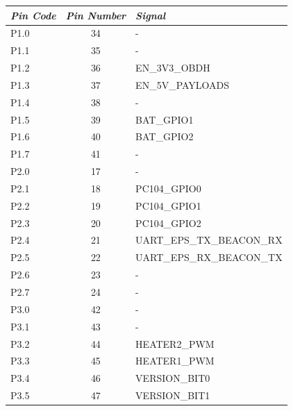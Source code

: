 \begin{longtable}{lcl}
    \toprule[1.5pt]
    \textit{Pin Code} & \textit{Pin Number} & \textit{Signal}       \\
    \midrule
    P1.0              & 34                  & -                 \\
    P1.1              & 35                  & -                 \\
    P1.2              & 36                  & EN\_3V3\_OBDH     \\
    P1.3              & 37                  & EN\_5V\_PAYLOADS  \\
    P1.4              & 38                  & -             \\
    P1.5              & 39                  & BAT\_GPIO1    \\
    P1.6              & 40                  & BAT\_GPIO2    \\
    P1.7              & 41                  & -             \\
    \midrule
    P2.0              & 17                  & -             \\
    P2.1              & 18                  & PC104\_GPIO0  \\
    P2.2              & 19                  & PC104\_GPIO1  \\
    P2.3              & 20                  & PC104\_GPIO2  \\
    P2.4              & 21                  & UART\_EPS\_TX\_BEACON\_RX     \\
    P2.5              & 22                  & UART\_EPS\_RX\_BEACON\_TX     \\
    P2.6              & 23                  & -                     \\
    P2.7              & 24                  & -                     \\
    \midrule
    P3.0              & 42                  & -                     \\
    P3.1              & 43                  & -                     \\
    P3.2              & 44                  & HEATER2\_PWM          \\
    P3.3              & 45                  & HEATER1\_PWM          \\
    P3.4              & 46                  & VERSION\_BIT0         \\
    P3.5              & 47                  & VERSION\_BIT1         \\

\end{longtable}
